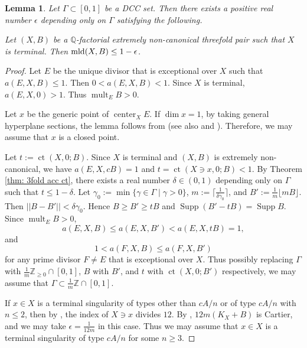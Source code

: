 \documentclass[11pt]{amsart}
\numberwithin{equation}{section}
\newcommand{\Qq}{\mathbb{Q}}
\newcommand{\Zz}{\mathbb{Z}}
\newcommand{\Center}{\operatorname{center}}
\newcommand{\mld}{{\rm{mld}}}
\newcommand{\ct}{\operatorname{ct}}
\newcommand{\Supp}{\operatorname{Supp}}
\newcommand{\mult}{\operatorname{mult}}
\newcommand{\Ii}{{\Gamma}}
\newtheorem{lem}[thm]{Lemma}
\theoremstyle{definition}
\theoremstyle{definition}
\begin{document}
\begin{lem}\label{lem: 1-gap X terminal extreme case}
Let $\Ii\subset [0,1]$ be a DCC set. Then there exists a positive real number $\epsilon$ depending only on $\Ii$ satisfying the following.

Let $(X,B)$ be a $\Qq$-factorial extremely non-canonical threefold pair such that $X$ is terminal. Then $\mld(X,B)\leq 1-\epsilon$.
\end{lem}
\begin{proof}
Let $E$ be the unique divisor that is exceptional over $X$ such that $a(E,X,B)\leq 1$. Then $0<a(E,X,B)<1$. Since $X$ is terminal, $a(E,X,0)>1$. Thus $\mult_EB>0$.%

Let $x$ be the generic point of $\Center_XE$. If $\dim x=1$, by taking general hyperplane sections, the lemma follows from  \cite[Theorem~3.8]{Ale93} (see also \cite{Sho94b} and \cite[Theorem~1.5]{HL20}). Therefore, we may assume that $x$ is a closed point. 

\medskip

Let $t:=\ct(X,0;B)$. Since $X$ is terminal and $(X,B)$ is extremely non-canonical, we have $a(E,X,cB)=1$ and $t=\ct(X\ni x,0;B)<1$. By Theorem \ref{thm: 3fold acc ct}, there exists a real number $\delta\in (0,1)$ depending only on $\Ii$ such that $t\leq 1-\delta$. Let $\gamma_0:=\min\{\gamma\in\Ii\mid \gamma>0\}$, $m:=\lceil\frac{1}{\delta\gamma_0}\rceil$, and $B':=\frac{1}{m}\lfloor mB\rfloor$. Then $||B-B'||<\delta\gamma_0$. Hence $B\geq B'\geq tB$ and $\Supp(B'-tB)=\Supp B$. Since $\mult_EB>0$,
$$a(E,X,B)\leq a(E,X,B')<a(E,X,tB)=1,$$
and
$$1<a(F,X,B)\leq a(F,X,B')$$
for any prime divisor $F\not=E$ that is exceptional over $X$. Thus possibly replacing $\Ii$ with $\frac{1}{m}\Zz_{\geq 0}\cap [0,1]$, $B$ with $B'$, and $t$ with $\ct(X,0;B')$ respectively, we may assume that $\Ii\subset \frac{1}{m}\mathbb{Z}\cap[0,1]$.

\medskip


If $x\in X$ is a terminal singularity of types other than $cA/n$ or of type $cA/n$ with $n\le 2$, then by \cite[(6.1) Theorem]{Rei87}, the index of $X\ni x$ divides $12$. By \cite[Lemma~5.1]{Kaw88}, $12m(K_X+B)$ is Cartier, and we may take $\epsilon=\frac{1}{12m}$ in this case. Thus we may assume that $x\in X$ is a terminal singularity of type $cA/n$ for some $n\geq 3$. 

\medskip


\end{proof}
\end{document}
